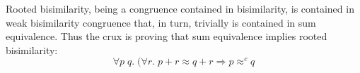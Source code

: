 %
Rooted bisimilarity, being a congruence contained in bisimilarity,  
is contained in   weak bisimilarity congruence that, in turn,
trivially is contained in sum
equivalence. Thus the crux is proving that sum equivalence implies
rooted bisimilarity:
\begin{equation}
\label{equa:pq}
\forall p\; q.\; ( \forall r.\; p+r \approx
q+r \Longrightarrow 
 p \approx^c\! q  
\end{equation}
